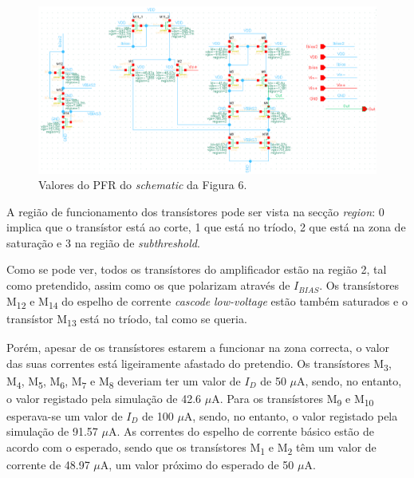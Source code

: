 \documentclass[11pt]{article}
\numberwithin{equation}{section}
\begin{document}
\begin{figure}[H]
	\centering
	\includegraphics[keepaspectratio=true, scale=0.85]{exps/PFRoriginais}
	\vspace{-0.5em}
	\caption{Valores do PFR do \textit{schematic} da Figura 6.}
	\vspace{-0.8em}
\end{figure} 

A região de funcionamento dos transístores pode ser vista na secção \textit{region}: 0 implica que o transístor está ao corte, 1 que está no tríodo, 2 que está na zona de saturação e 3 na região de \textit{subthreshold}.

Como se pode ver, todos os transístores do amplificador estão na região 2, tal como pretendido, assim como os que polarizam através de $I_{BIAS}$. Os transístores M\textsubscript{12} e M\textsubscript{14} do espelho de corrente \textit{cascode} \textit{low-voltage} estão também saturados e o transístor M\textsubscript{13} está no tríodo, tal como se queria.

Porém, apesar de os transístores estarem a funcionar na zona correcta, o valor das suas correntes está ligeiramente afastado do pretendio. Os transístores M\textsubscript{3}, M\textsubscript{4}, M\textsubscript{5}, M\textsubscript{6}, M\textsubscript{7} e M\textsubscript{8} deveriam ter um valor de $I_D$ de 50 $\mu$A, sendo, no entanto, o valor registado pela simulação de 42.6 $\mu$A. Para os transístores M\textsubscript{9} e M\textsubscript{10} esperava-se um valor de $I_D$ de 100 $\mu$A, sendo, no entanto, o valor registado pela simulação de 91.57 $\mu$A. As correntes do espelho de corrente básico estão de acordo com o esperado, sendo que os transístores M\textsubscript{1} e M\textsubscript{2} têm um valor de corrente de 48.97 $\mu$A, um valor próximo do esperado de 50 $\mu$A.

\end{document}
